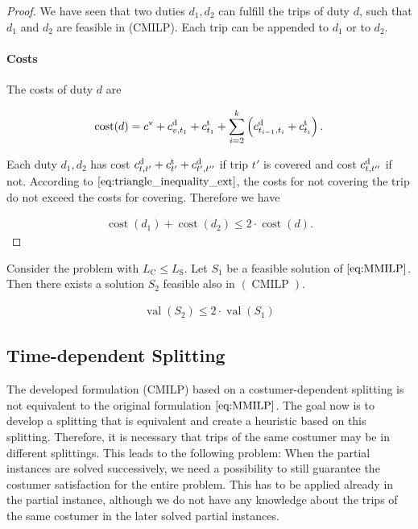 \begin{proof}
We have seen that two duties $d_1,d_2$ can fulfill the trips of duty $d$, such that $d_1$ and $d_2$ are feasible in (CMILP). Each trip can be appended to $d_1$ or to $d_2$.

\paragraph{Costs}

The costs of duty $d$ are

\begin{align*}
	\operatorname{cost}(d)=c^{\operatorname{v}}+c^{\operatorname{d}}_{v,t_1}+c^{\operatorname{t}}_{t_1}+\sum_{i=2}^k \left(c^{\operatorname{d}}_{t_{i-1},t_i}+c^{\operatorname{t}}_{t_i}\right).
\end{align*}

Each duty $d_1,d_2$ has cost $c^{\operatorname{d}}_{t,t'}+c^{\operatorname{t}}_{t'}+c^{\operatorname{d}}_{t',t''}$ if trip $t'$ is covered and cost $c^{\operatorname{d}}_{t,t''}$ if not. According to $\eqref{eq:triangle_inequality_ext}$, the costs for not covering the trip do not exceed the costs for covering. Therefore we have

\begin{align*}
	\operatorname{cost}\left(d_1\right)+\operatorname{cost}\left(d_2\right)\leq 2\cdot\operatorname{cost}\left(d\right).
\end{align*}

\end{proof}

\begin{corollary}

Consider the problem with $L_{\operatorname{C}}\leq L_{\operatorname{S}}$. Let $S_1$ be a feasible solution of $\eqref{eq:MMILP}$. Then there exists a solution $S_2$ feasible also in $(\operatorname{CMILP})$.

\begin{align*}
	\operatorname{val}\left(S_2\right)\leq 2\cdot\operatorname{val}\left(S_1\right)
\end{align*}

\end{corollary}


\subsection{Time-dependent Splitting}

The developed formulation (CMILP) based on a costumer-dependent splitting is not equivalent to the original formulation $\eqref{eq:MMILP}$. The goal now is to develop a splitting that is equivalent and create a heuristic based on this splitting. Therefore, it is necessary that trips of the same costumer may be in different splittings. This leads to the following problem: When the partial instances are solved successively, we need a possibility to still guarantee the costumer satisfaction for the entire problem. This has to be applied already in the partial instance, although we do not have any knowledge about the trips of the same costumer in the later solved partial instances.

